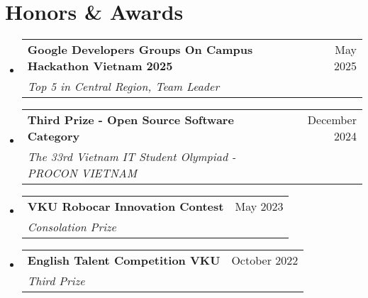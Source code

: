 \documentclass[letterpaper,11pt]{article}
\makeatletter
\newcommand{\resumeSubheading}[4]{
  \vspace{-2pt}\item
    \begin{tabular*}{0.97\textwidth}[t]{l@{\extracolsep{\fill}}r}
      \textbf{#1} & #2 \\
      \textit{\small#3} & \textit{\small #4} \\
    \end{tabular*}\vspace{-7pt}
}
\newcommand{\resumeSubHeadingListStart}{\begin{itemize}[leftmargin=0.15in, label={}]}
\newcommand{\resumeSubHeadingListEnd}{\end{itemize}}
\makeatother
\begin{document}
\section{Honors \& Awards}
  \resumeSubHeadingListStart
    \resumeSubheading
      {Google Developers Groups On Campus Hackathon Vietnam 2025}{May 2025}
      {Top 5 in Central Region, Team Leader}{}
    \resumeSubheading
      {Third Prize - Open Source Software Category}{December 2024}
      {The 33rd Vietnam IT Student Olympiad - PROCON VIETNAM}{}
    \resumeSubheading
      {VKU Robocar Innovation Contest}{May 2023}
      {Consolation Prize}{}
    \resumeSubheading
      {English Talent Competition VKU}{October 2022}
      {Third Prize}{}
  \resumeSubHeadingListEnd
\end{document}
